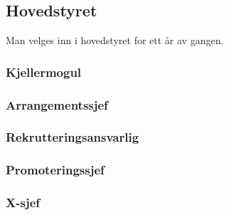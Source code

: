 \documentclass[10pt,norsk,a4paper,usenames,dvipsnames]{article}
\begin{document}
    \begin{minipage}[t]{0.49\textwidth}
        \subsection{Hovedstyret}
            Man velges inn i hovedstyret for ett år av gangen.
        
        
        
        
        \subsubsection{Kjellermogul}
        
        \subsubsection{Arrangementssjef}
        
        
        \subsubsection{Rekrutteringsansvarlig}
        
        
        
        \subsubsection{Promoteringssjef}
        
        \subsubsection{X-sjef}
            
            
    \end{minipage}
\end{document}
